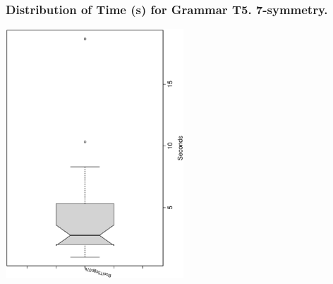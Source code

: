  \begin{frame}
 \frametitle{ Distribution of Time (s) for Grammar T5. 7-symmetry. }
 \begin{center}
\includegraphics[width=0.5\textwidth, angle=-90]
{ExpFboxplottSeconds005.eps}
 \end{center}
 \label{ExpFboxplottSeconds005.eps}  
 \end{frame}

